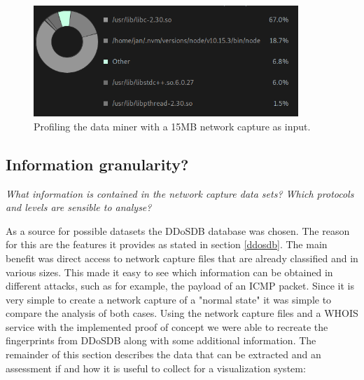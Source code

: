     \begin{figure}[]
    \centering
    \includegraphics[width=10cm]{images/profiling.png}
    \caption{Profiling the data miner with a 15MB network capture as input.}
    \label{fig:profiling}
\end{figure}


\subsection{Information granularity?}
\textit{What information is contained in the network capture data sets? Which protocols and levels are sensible to analyse?
}

As a source for possible datasets the DDoSDB database was chosen. The reason for this are the features it provides as stated in section \ref{ddosdb}. The main benefit was direct access to network capture files that are already classified and in various sizes. This made it easy to see which information can be obtained in different attacks, such as for example, the payload of an ICMP packet. Since it is very simple to create a network capture of a "normal state" it was simple to compare the analysis of both cases.
Using the network capture files and a WHOIS service with the implemented proof of concept we were able to recreate the fingerprints from DDoSDB along with some additional information. The remainder of this section describes the data that can be extracted and an assessment if and how it is useful to collect for a visualization system:

